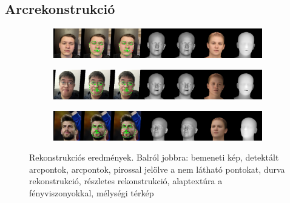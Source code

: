\documentclass[12pt,a4]{article}
\begin{document}
        \subsection{Arcrekonstrukció}
        \begin{figure}[htb]
                \centering
                 \begin{subfigure}[b]{1\textwidth}
                   \includegraphics[width=1\linewidth]{ruben_vis.jpg}
                \end{subfigure}

                \begin{subfigure}[b]{1\textwidth}
                   \includegraphics[width=1\linewidth]{hua_vis.jpg}
                \end{subfigure}
                
                \begin{subfigure}[b]{1\textwidth}
                   \includegraphics[width=1\linewidth]{pique_vis.jpg}
                \end{subfigure}

        
                \caption{Rekonstrukciós eredmények. Balról jobbra: bemeneti kép, detektált arcpontok, arcpontok, pirossal jelölve a nem látható pontokat, durva rekonstrukció, részletes rekonstrukció, alaptextúra a fényviszonyokkal, mélységi térkép}
                \label{fig:our-reconstruction-results}
            \end{figure}
            
\end{document}

